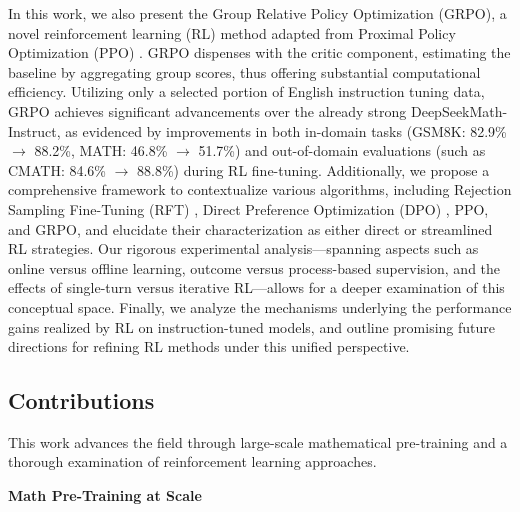 In this work, we also present the Group Relative Policy Optimization (GRPO), a novel reinforcement learning (RL) method adapted from Proximal Policy Optimization (PPO) \citep{schulman2017proximal}. GRPO dispenses with the critic component, estimating the baseline by aggregating group scores, thus offering substantial computational efficiency. Utilizing only a selected portion of English instruction tuning data, GRPO achieves significant advancements over the already strong DeepSeekMath-Instruct, as evidenced by improvements in both in-domain tasks (GSM8K: 82.9\% $\rightarrow$ 88.2\%, MATH: 46.8\% $\rightarrow$ 51.7\%) and out-of-domain evaluations (such as CMATH: 84.6\% $\rightarrow$ 88.8\%) during RL fine-tuning. Additionally, we propose a comprehensive framework to contextualize various algorithms, including Rejection Sampling Fine-Tuning (RFT) \citep{yuan2023scaling}, Direct Preference Optimization (DPO) \citep{dpo}, PPO, and GRPO, and elucidate their characterization as either direct or streamlined RL strategies. Our rigorous experimental analysis—spanning aspects such as online versus offline learning, outcome versus process-based supervision, and the effects of single-turn versus iterative RL—allows for a deeper examination of this conceptual space. Finally, we analyze the mechanisms underlying the performance gains realized by RL on instruction-tuned models, and outline promising future directions for refining RL methods under this unified perspective.

\subsection{Contributions}
This work advances the field through large-scale mathematical pre-training and a thorough examination of reinforcement learning approaches.

\textbf{Math Pre-Training at Scale}

